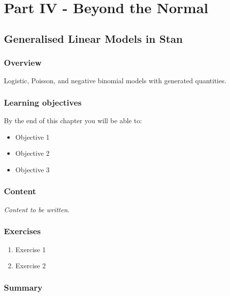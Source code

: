 \documentclass[
  11pt,
  a4paper,
  oneside,
  openany]{scrbook}
\providecommand{\tightlist}{%
  \setlength{\itemsep}{0pt}\setlength{\parskip}{0pt}}\usepackage{longtable,booktabs,array}
\begin{document}
\part{Part IV - Beyond the Normal}

\chapter{Generalised Linear Models in
Stan}\label{generalised-linear-models-in-stan}

\section{Overview}\label{overview-10}

Logistic, Poisson, and negative binomial models with generated
quantities.

\section{Learning objectives}\label{learning-objectives-10}

By the end of this chapter you will be able to:

\begin{itemize}
\tightlist
\item[$\square$]
  Objective 1
\item[$\square$]
  Objective 2
\item[$\square$]
  Objective 3
\end{itemize}

\section{Content}\label{content-9}

\emph{Content to be written.}

\section{Exercises}\label{exercises-10}

\begin{enumerate}
\def\labelenumi{\arabic{enumi}.}
\tightlist
\item
  Exercise 1
\item
  Exercise 2
\end{enumerate}

\section{Summary}\label{summary-10}
\end{document}
